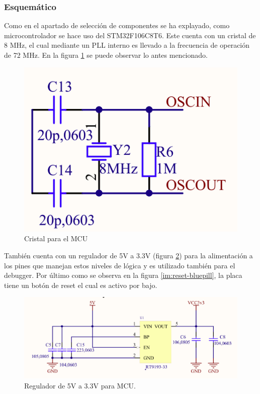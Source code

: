 \subsubsection{Esquemático}
\par Como en el apartado de selección de componentes se ha explayado, como microcontrolador se hace uso del STM32F106C8T6. Este 
cuenta con un cristal de 8 MHz, el cual mediante un PLL interno es llevado a la frecuencia de operación de 72 MHz. En la
figura \ref{cristal_bluepill} se puede observar lo antes mencionado.

\begin{figure}[!h]
	\centering
	\includegraphics[scale=0.35]{images/central/bluepill-osc.png}
    \caption{Cristal para el MCU}
	\label{cristal_bluepill}
\end{figure}

\par También cuenta con un regulador de 5V a 3.3V (figura \ref{im:reg-bluepill}) para la alimentación a los pines que manejan estos niveles de lógica y es utilizado también para el debugger. Por último como se observa en la figura \ref{im:reset-bluepill}, la placa tiene un botón de reset el cual es activo por bajo. 

\begin{figure}[!h]
	\centering
	\includegraphics[scale=0.6]{images/central/bluepill-reg.png}
    \caption{Regulador de 5V a 3.3V para MCU.}
	\label{im:reg-bluepill}
\end{figure}

